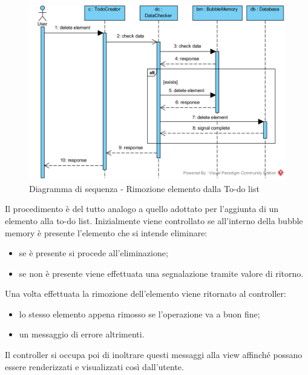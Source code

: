 \begin{figure}[H]
	\centering
	\includegraphics[width=14cm]{../../documenti/SpecificaTecnica/diagrammi_img/sequenza/todo_rimuovi_elemento.png}
	\caption{Diagramma di sequenza - Rimozione elemento dalla To-do list}
\end{figure}
Il procedimento è del tutto analogo a quello adottato per l'aggiunta di un elemento alla to-do list. Inizialmente viene controllato se all'interno della bubble memory è presente l'elemento che si intende eliminare: 
\begin{itemize}
	\item se è presente si procede all'eliminazione;
	\item se non è presente viene effettuata una segnalazione tramite valore di ritorno.
\end{itemize}
Una volta effettuata la rimozione dell'elemento viene ritornato al controller:
\begin{itemize}
	\item lo stesso elemento appena rimosso se l'operazione va a buon fine;
	\item un messaggio di errore altrimenti.
\end{itemize}
Il controller si occupa poi di inoltrare questi messaggi alla view affinché possano essere renderizzati e visualizzati così dall'utente.

